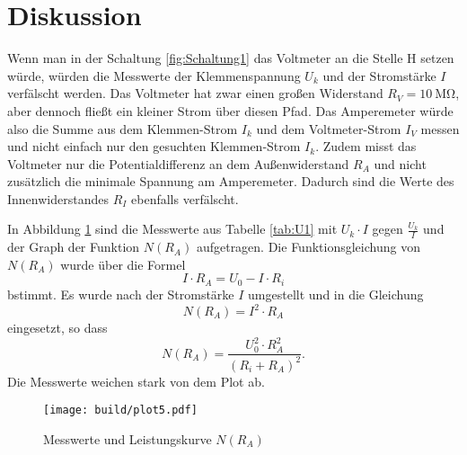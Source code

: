 \section{Diskussion}
\label{sec:Diskussion}

Wenn man in der Schaltung \ref{fig:Schaltung1} das Voltmeter an die Stelle H
setzen würde, würden die Messwerte der Klemmenspannung $U_k$ und der
Stromstärke $I$ verfälscht werden. Das Voltmeter hat zwar einen großen
Widerstand $R_V = \SI{10}{\mega\ohm}$, aber dennoch fließt ein kleiner Strom
über diesen Pfad. Das Amperemeter würde also die Summe aus dem
Klemmen-Strom $I_k$ und dem Voltmeter-Strom $I_V$ messen und nicht einfach
nur den gesuchten Klemmen-Strom $I_k$.
Zudem misst das Voltmeter nur die Potentialdifferenz an dem Außenwiderstand
$R_A$ und nicht zusätzlich die minimale Spannung am Amperemeter. Dadurch
sind die Werte des Innenwiderstandes $R_I$ ebenfalls verfälscht.

In Abbildung \ref{fig:U5} sind die Messwerte aus Tabelle \ref{tab:U1}
mit $U_k \cdot I$ gegen $\frac{U_k}{I}$ und der Graph der Funktion $N(R_A)$
aufgetragen. Die Funktionsgleichung von $N(R_A)$ wurde über die Formel
\begin{equation}
  I \cdot R_A = U_0 - I \cdot R_i
\end{equation}
bstimmt. Es wurde nach der Stromstärke $I$ umgestellt und in die Gleichung
\begin{equation}
  N(R_A) = I^2 \cdot R_A
\end{equation}
eingesetzt, so dass
\begin{equation}
  N(R_A) = \frac{U_0^2 \cdot R_A^2}{(R_i + R_A)^2}.
\end{equation}
Die Messwerte weichen stark von dem Plot ab.

\begin{figure}[h]
  \texttt{[image: build/plot5.pdf]}
  \caption{Messwerte und Leistungskurve $N(R_A)$}
  \label{fig:U5}
\end{figure}
